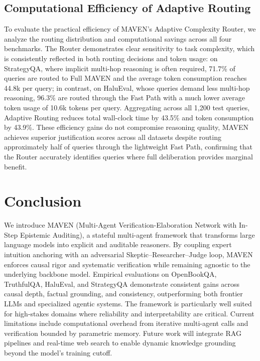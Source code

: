\documentclass{article}
\begin{document}
\subsection{Computational Efficiency of Adaptive Routing}
\label{subsec:efficiency}

To evaluate the practical efficiency of MAVEN's Adaptive Complexity Router, we analyze the routing distribution and computational savings across all four benchmarks. The Router demonstrates clear sensitivity to task complexity, which is consistently reflected in both routing decisions and token usage: on StrategyQA, where implicit multi-hop reasoning is often required, 71.7\% of queries are routed to Full MAVEN and the average token consumption reaches 44.8k per query; in contrast, on HaluEval, whose queries demand less multi-hop reasoning, 96.3\% are routed through the Fast Path with a much lower average token usage of 10.6k tokens per query. Aggregating across all 1,200 test queries, Adaptive Routing reduces total wall-clock time by 43.5\% and token consumption by 43.9\%. These efficiency gains do not compromise reasoning quality, MAVEN achieves superior justification scores across all datasets despite routing approximately half of queries through the lightweight Fast Path, confirming that the Router accurately identifies queries where full deliberation provides marginal benefit.

\section{Conclusion}
\label{sec:conclusion}

We introduce MAVEN (Multi-Agent Verification-Elaboration Network with In-Step Epistemic Auditing), a stateful multi-agent framework that transforms large language models into explicit and auditable reasoners. By coupling expert intuition anchoring with an adversarial Skeptic–Researcher–Judge loop, MAVEN enforces causal rigor and systematic verification while remaining agnostic to the underlying backbone model. Empirical evaluations on OpenBookQA, TruthfulQA, HaluEval, and StrategyQA demonstrate consistent gains across causal depth, factual grounding, and consistency, outperforming both frontier LLMs and specialized agentic systems. The framework is particularly well suited for high-stakes domains where reliability and interpretability are critical. Current limitations include computational overhead from iterative multi-agent calls and verification bounded by parametric memory. Future work will integrate RAG pipelines and real-time web search to enable dynamic knowledge grounding beyond the model's training cutoff.
\end{document}
